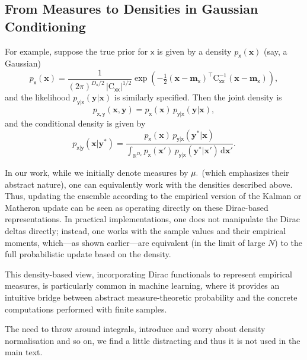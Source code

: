 \documentclass[runningheads]{llncs}
\newcommand{\vv}[1]{\boldsymbol{#1}}
\newcommand{\mm}[1]{\mathrm{#1}}
\newcommand{\rv}[1]{\mathsf{#1}}
\newcommand{\vrv}[1]{\vv{\rv{#1}}}
\begin{document}
\subsection*{From Measures to Densities in Gaussian Conditioning}

For example, suppose the true prior for \(\vrv{x}\) is given by a density \(p_{\vrv{x}}(\vv{x})\) (say, a Gaussian)
\[
    p_{\vrv{x}}(\vv{x}) = \frac{1}{(2\pi)^{D_{\vrv{x}}/2} \,|\mm{C}_{\vrv{xx}}|^{1/2}} \exp\!\left(-\tfrac{1}{2}(\vv{x}-\vv{m}_{\vrv{x}})^\top \mm{C}_{\vrv{xx}}^{-1} (\vv{x}-\vv{m}_{\vrv{x}})\right),
\]
and the likelihood \(p_{\vrv{y}|\vrv{x}}(\vv{y}|\vv{x})\) is similarly specified. Then the joint density is
\begin{equation}
    p_{\vrv{x},\vrv{y}}(\vv{x},\vv{y})
    = p_{\vrv{x}}(\vv{x})\,p_{\vrv{y}|\vrv{x}}(\vv{y}|\vv{x}),
\end{equation}
and the conditional density is given by
\begin{equation}
    p_{\vrv{x}|\vrv{y}}(\vv{x}|\vv{y}^*)
    = \frac{p_{\vrv{x}}(\vv{x})\,p_{\vrv{y}|\vrv{x}}(\vv{y}^*|\vv{x})}{\int_{\mathbb{R}^{D_{\vrv{x}}}} p_{\vrv{x}}(\vv{x}')\,p_{\vrv{y}|\vrv{x}}(\vv{y}^*|\vv{x}')\,\mathrm{d}\vv{x}'}.
\end{equation}

In our work, while we initially denote measures by \(\Law[\cdot]\) (which emphasizes their abstract nature), one can equivalently work with the densities described above.
Thus, updating the ensemble according to the empirical version of the Kalman or Matheron update can be seen as operating directly on these Dirac-based representations.
In practical implementations, one does not manipulate the Dirac deltas directly; instead, one works with the sample values and their empirical moments, which—as shown earlier—are equivalent (in the limit of large \(N\)) to the full probabilistic update based on the density.

This density-based view, incorporating Dirac functionals to represent empirical measures, is particularly common in machine learning, where it provides an intuitive bridge between abstract measure-theoretic probability and the concrete computations performed with finite samples.

The need to throw around integrals, introduce and worry about density normalisation and so on, we find a little distracting and thus it is not used in the main text.


\end{document}
